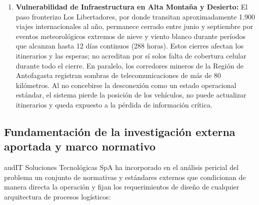 \begin{enumerate}
  \item \textbf{Vulnerabilidad de Infraestructura en Alta Montaña y Desierto:} El paso fronterizo Los Libertadores, por donde transitan aproximadamente 1.900 viajes internacionales al año, permanece cerrado entre junio y septiembre por eventos meteorológicos extremos de nieve y viento blanco durante períodos que alcanzan hasta 12 días continuos (288 horas). Estos cierres afectan los itinerarios y las esperas; no acreditan por sí solos falta de cobertura celular durante todo el cierre. En paralelo, los corredores mineros de la Región de Antofagasta registran sombras de telecomunicaciones de más de 80 kilómetros. Al no concebirse la desconexión como un estado operacional estándar, el sistema pierde la posición de los vehículos, no puede actualizar itinerarios y queda expuesto a la pérdida de información crítica.
\end{enumerate}

\subsection{Fundamentación de la investigación externa aportada y marco normativo}\label{sec:2-marco-normativo}

audIT Soluciones Tecnológicas SpA ha incorporado en el análisis pericial del problema un conjunto de normativas y estándares externos que condicionan de manera directa la operación y fijan los requerimientos de diseño de cualquier arquitectura de procesos logísticos:

